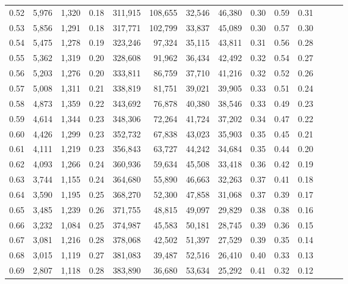 \begin{tabular}{rrrrrrrrrrrrrr}
0.52 &   5,976 &  1,320 &  0.18 &  311,915 &  108,655 &  32,546 &  46,380 &  0.30 &  0.59 &      0.31 \\
0.53 &   5,856 &  1,291 &  0.18 &  317,771 &  102,799 &  33,837 &  45,089 &  0.30 &  0.57 &      0.30 \\
0.54 &   5,475 &  1,278 &  0.19 &  323,246 &   97,324 &  35,115 &  43,811 &  0.31 &  0.56 &      0.28 \\
0.55 &   5,362 &  1,319 &  0.20 &  328,608 &   91,962 &  36,434 &  42,492 &  0.32 &  0.54 &      0.27 \\
0.56 &   5,203 &  1,276 &  0.20 &  333,811 &   86,759 &  37,710 &  41,216 &  0.32 &  0.52 &      0.26 \\
0.57 &   5,008 &  1,311 &  0.21 &  338,819 &   81,751 &  39,021 &  39,905 &  0.33 &  0.51 &      0.24 \\
0.58 &   4,873 &  1,359 &  0.22 &  343,692 &   76,878 &  40,380 &  38,546 &  0.33 &  0.49 &      0.23 \\
0.59 &   4,614 &  1,344 &  0.23 &  348,306 &   72,264 &  41,724 &  37,202 &  0.34 &  0.47 &      0.22 \\
0.60 &   4,426 &  1,299 &  0.23 &  352,732 &   67,838 &  43,023 &  35,903 &  0.35 &  0.45 &      0.21 \\
0.61 &   4,111 &  1,219 &  0.23 &  356,843 &   63,727 &  44,242 &  34,684 &  0.35 &  0.44 &      0.20 \\
0.62 &   4,093 &  1,266 &  0.24 &  360,936 &   59,634 &  45,508 &  33,418 &  0.36 &  0.42 &      0.19 \\
0.63 &   3,744 &  1,155 &  0.24 &  364,680 &   55,890 &  46,663 &  32,263 &  0.37 &  0.41 &      0.18 \\
0.64 &   3,590 &  1,195 &  0.25 &  368,270 &   52,300 &  47,858 &  31,068 &  0.37 &  0.39 &      0.17 \\
0.65 &   3,485 &  1,239 &  0.26 &  371,755 &   48,815 &  49,097 &  29,829 &  0.38 &  0.38 &      0.16 \\
0.66 &   3,232 &  1,084 &  0.25 &  374,987 &   45,583 &  50,181 &  28,745 &  0.39 &  0.36 &      0.15 \\
0.67 &   3,081 &  1,216 &  0.28 &  378,068 &   42,502 &  51,397 &  27,529 &  0.39 &  0.35 &      0.14 \\
0.68 &   3,015 &  1,119 &  0.27 &  381,083 &   39,487 &  52,516 &  26,410 &  0.40 &  0.33 &      0.13 \\
0.69 &   2,807 &  1,118 &  0.28 &  383,890 &   36,680 &  53,634 &  25,292 &  0.41 &  0.32 &      0.12 \\

\end{tabular}
